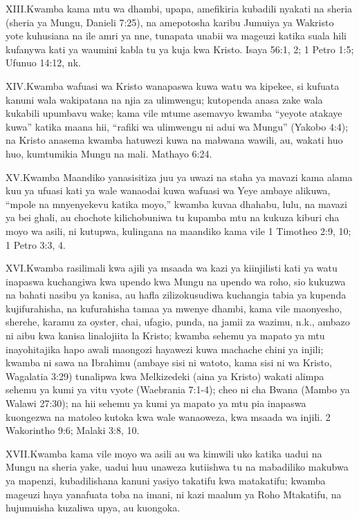 \lettrine{XIII.} Kwamba kama mtu wa dhambi, upapa, amefikiria kubadili nyakati na sheria (sheria ya Mungu, Danieli 7:25), na amepotosha karibu Jumuiya ya Wakristo yote kuhusiana na ile amri ya nne, tunapata unabii wa mageuzi katika suala hili kufanywa kati ya waumini kabla tu ya kuja kwa Kristo. Isaya 56:1, 2; 1 Petro 1:5; Ufunuo 14:12, nk.

\lettrine{XIV.} Kwamba wafuasi wa Kristo wanapaswa kuwa watu wa kipekee, si kufuata kanuni wala wakipatana na njia za ulimwengu; kutopenda anasa zake wala kukabili upumbavu wake; kama vile mtume asemavyo kwamba “yeyote atakaye kuwa” katika maana hii, “rafiki wa ulimwengu ni adui wa Mungu” (Yakobo 4:4); na Kristo anasema kwamba hatuwezi kuwa na mabwana wawili, au, wakati huo huo, kumtumikia Mungu na mali. Mathayo 6:24.

\lettrine{XV.} Kwamba Maandiko yanasisitiza juu ya uwazi na staha ya mavazi kama alama kuu ya ufuasi kati ya wale wanaodai kuwa wafuasi wa Yeye ambaye alikuwa, “mpole na mnyenyekevu katika moyo,” kwamba kuvaa dhahabu, lulu, na mavazi ya bei ghali, au chochote kilichobuniwa tu kupamba mtu na kukuza kiburi cha moyo wa asili, ni kutupwa, kulingana na maandiko kama vile 1 Timotheo 2:9, 10; 1 Petro 3:3, 4.

\lettrine{XVI.} Kwamba rasilimali kwa ajili ya msaada wa kazi ya kiinjilisti kati ya watu inapaswa kuchangiwa kwa upendo kwa Mungu na upendo wa roho, sio kukuzwa na bahati nasibu ya kanisa, au hafla zilizokusudiwa kuchangia tabia ya kupenda kujifurahisha, na kufurahisha tamaa ya mwenye dhambi, kama vile maonyesho, sherehe, karamu za oyster, chai, ufagio, punda, na jamii za wazimu, n.k., ambazo ni aibu kwa kanisa linalojiita la Kristo; kwamba sehemu ya mapato ya mtu inayohitajika hapo awali maongozi hayawezi kuwa machache chini ya injili; kwamba ni sawa na Ibrahimu (ambaye sisi ni watoto, kama sisi ni wa Kristo, Wagalatia 3:29) tunalipwa kwa Melkizedeki (aina ya Kristo) wakati alimpa sehemu ya kumi ya vitu vyote (Waebrania 7:1-4); cheo ni cha Bwana (Mambo ya Walawi 27:30); na hii sehemu ya kumi ya mapato ya mtu pia inapaswa kuongezwa na matoleo kutoka kwa wale wanaoweza, kwa msaada wa injili. 2 Wakorintho 9:6; Malaki 3:8, 10.

\lettrine{XVII.} Kwamba kama vile moyo wa asili au wa kimwili uko katika uadui na Mungu na sheria yake, uadui huu unaweza kutiishwa tu na mabadiliko makubwa ya mapenzi, kubadilishana kanuni yasiyo takatifu kwa matakatifu; kwamba mageuzi haya yanafuata toba na imani, ni kazi maalum ya Roho Mtakatifu, na hujumuisha kuzaliwa upya, au kuongoka.

